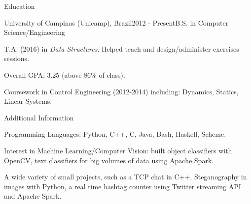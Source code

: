 \documentclass[8pt]{resume}
\newcommand{\tit}[1]{\textit{#1}}
\begin{document}
\begin{rSection}{Education}

\begin{rSubsection}{University of Campinas (Unicamp), Brazil}{2012 - Present}{B.S. in Computer Science/Engineering}{}
    \item T.A. (2016) in \tit{Data Structures}. Helped
        teach and design/administer exercises sessions.
    \item Overall GPA: 3.25 (above 86\% of class).
    \item Coursework in Control Engineering (2012-2014) including:
        Dynamics, Statics, Linear Systems.
\end{rSubsection}

\end{rSection}

\begin{rSection}{Additional Information}

\begin{rSubsection}{}{}{}{}
    \item Programming Languages: Python, C++, C, Java, Bash, Haskell, Scheme.
    \item Interest in Machine Learning/Computer Vision:
        built object classifiers with OpenCV,
        text classifiers for big volumes of data using Apache Spark.
    \item A wide variety of small projects, such as a TCP chat in C++,
        Steganography in images with Python, a real time hashtag counter
        using Twitter streaming API and Apache Spark.
\end{rSubsection}

\end{rSection}
\end{document}
